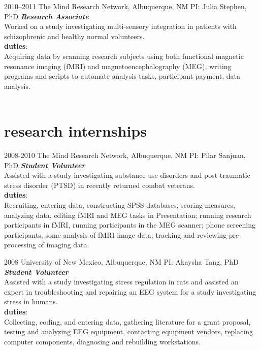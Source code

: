 \documentclass[]{friggeri-cv} %
\begin{document}
\begin{entrylist}
\entry
{\footnotesize{2010--2011}}
{The Mind Research Network, Albuquerque, NM \textemdash PI: Julia Stephen, PhD}
{}
{\emph{\textbf{Research Associate}} \\
Worked on a study investigating multi-sensory integration in
patients with schizophrenic and healthy normal volunteers. \\
\textbf{duties}:\\
Acquiring data by scanning research subjects using both functional
magnetic resonance imaging (fMRI) and magnetoencephalography (MEG), writing
programs and scripts to automate analysis tasks, 
participant payment, data analysis.} \\ \\ 
\end{entrylist}
\newpage

\section{research internships}
\begin{entrylist}
\entry
{\footnotesize{2008-2010}}
{The Mind Research Network, Albuquerque, NM \textemdash PI: Pilar Sanjuan, PhD}
{}
{\emph{\textbf{Student Volunteer}} \\
Assisted with a study investigating substance use disorders and
post-traumatic stress disorder (PTSD) in recently returned combat veterans. \\
\textbf{duties}: \\
Recruiting, entering data, constructing SPSS databases, scoring
measures, analyzing data, editing fMRI and MEG tasks in Presentation; running research
participants in fMRI, running participants in the MEG scanner; phone screening participants,
some analysis of fMRI image data; tracking and reviewing pre-processing of imaging data.}
\end{entrylist}

\begin{entrylist}
\entry
{\footnotesize{2008}}
{University of New Mexico, Albuquerque, NM \textemdash PI: Akaysha Tang, PhD}
{}
{\textbf{\emph{Student Volunteer}} \\
Assisted with a study investigating stress regulation in rats and assisted an
expert in troubleshooting and repairing an EEG system for a study investigating stress in
humans. \\
\textbf{duties}: \\
Collecting, coding, and entering data, gathering literature for a grant
proposal, testing and analyzing EEG equipment, contacting equipment vendors, replacing
computer components, diagnosing and rebuilding workstations.}
\end{entrylist}
\end{document}
